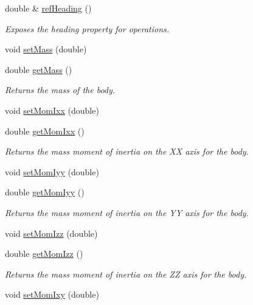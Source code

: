\begin{DoxyCompactItemize}
double \& \hyperlink{classosea_1_1ofreq_1_1_body_a7aef7cce12d2dbdd3e5ab789ba8fe669}{ref\-Heading} ()
\begin{DoxyCompactList}\small\item\em Exposes the heading property for operations. \end{DoxyCompactList}\item 
void \hyperlink{classosea_1_1ofreq_1_1_body_a896b660a9d001422f5d2b0b4e6d77b98}{set\-Mass} (double)
\item 
double \hyperlink{classosea_1_1ofreq_1_1_body_ac58abb2931cc56f2c0ff85700175a4d9}{get\-Mass} ()
\begin{DoxyCompactList}\small\item\em Returns the mass of the body. \end{DoxyCompactList}\item 
void \hyperlink{classosea_1_1ofreq_1_1_body_a2c9b1a384512fdd3fc5bb017289d1478}{set\-Mom\-Ixx} (double)
\item 
double \hyperlink{classosea_1_1ofreq_1_1_body_ac95aca5c89a30c42db96a8cfacecd89d}{get\-Mom\-Ixx} ()
\begin{DoxyCompactList}\small\item\em Returns the mass moment of inertia on the X\-X axis for the body. \end{DoxyCompactList}\item 
void \hyperlink{classosea_1_1ofreq_1_1_body_a4a92bccc2f40ba7d5fe754428d41195f}{set\-Mom\-Iyy} (double)
\item 
double \hyperlink{classosea_1_1ofreq_1_1_body_ade00f804ca3c40245527f5554580f331}{get\-Mom\-Iyy} ()
\begin{DoxyCompactList}\small\item\em Returns the mass moment of inertia on the Y\-Y axis for the body. \end{DoxyCompactList}\item 
void \hyperlink{classosea_1_1ofreq_1_1_body_a99662066111dcde2dd6fdbf8dd2230dd}{set\-Mom\-Izz} (double)
\item 
double \hyperlink{classosea_1_1ofreq_1_1_body_a00f9b6c0dfc59de42bb4ba6eaa80d707}{get\-Mom\-Izz} ()
\begin{DoxyCompactList}\small\item\em Returns the mass moment of inertia on the Z\-Z axis for the body. \end{DoxyCompactList}\item 
void \hyperlink{classosea_1_1ofreq_1_1_body_ad21041419756e97484ef399181e4b668}{set\-Mom\-Ixy} (double)
\item 

\end{DoxyCompactItemize}
